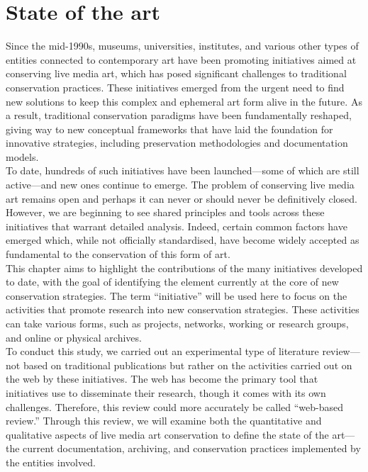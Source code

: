 \chapter{\label{ch:1-state_of_the_art}State of the art}

Since the mid-1990s, museums, universities, institutes, and various other types of entities connected to contemporary art have been promoting initiatives aimed at conserving live media art, which has posed significant challenges to traditional conservation practices. These initiatives emerged from the urgent need to find new solutions to keep this complex and ephemeral art form alive in the future. As a result, traditional conservation paradigms have been fundamentally reshaped, giving way to new conceptual frameworks that have laid the foundation for innovative strategies, including preservation methodologies and documentation models.\\
To date, hundreds of such initiatives have been launched—some of which are still active—and new ones continue to emerge. The problem of conserving live media art remains open and perhaps it can never or should never be definitively closed. However, we are beginning to see shared principles and tools across these initiatives that warrant detailed analysis. Indeed, certain common factors have emerged which, while not officially standardised, have become widely accepted as fundamental to the conservation of this form of art.\\
This chapter aims to highlight the contributions of the many initiatives developed to date, with the goal of identifying the element currently at the core of new conservation strategies. The term ``initiative'' will be used here to focus on the activities that promote research into new conservation strategies. These activities can take various forms, such as projects, networks, working or research groups, and online or physical archives.\\
To conduct this study, we carried out an experimental type of literature review—not based on traditional publications but rather on the activities carried out on the web by these initiatives. The web has become the primary tool that initiatives use to disseminate their research, though it comes with its own challenges. Therefore, this review could more accurately be called ``web-based review.'' Through this review, we will examine both the quantitative and qualitative aspects of live media art conservation to define the state of the art—the current documentation, archiving, and conservation practices implemented by the entities involved.\\
